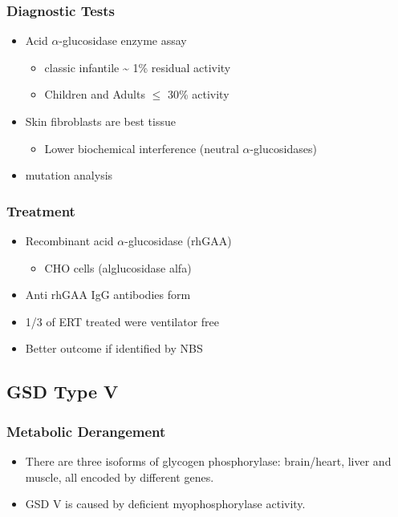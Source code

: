 \documentclass{scrartcl}
\begin{document}
\subsubsection{Diagnostic Tests}
\label{sec:org9a9de5c}
\begin{itemize}
\item Acid \(\alpha\)-glucosidase enzyme assay
\begin{itemize}
\item classic infantile \textasciitilde{} 1\% residual activity
\item Children and Adults \(\le\) 30\% activity
\end{itemize}
\item Skin fibroblasts are best tissue
\begin{itemize}
\item Lower biochemical interference (neutral \(\alpha\)-glucosidases)
\end{itemize}
\item mutation analysis
\end{itemize}
\subsubsection{Treatment}
\label{sec:orgc143356}
\begin{itemize}
\item Recombinant acid \(\alpha\)-glucosidase (rhGAA)
\begin{itemize}
\item CHO cells (alglucosidase alfa)
\end{itemize}
\item Anti rhGAA IgG antibodies form
\item 1/3 of ERT treated were ventilator free
\item Better outcome if identified by NBS
\end{itemize}

\subsection{GSD Type V}
\label{sec:org743d0e1}
\subsubsection{Metabolic Derangement}
\label{sec:orga5cfd03}
\begin{itemize}
\item There are three isoforms of glycogen phosphorylase: brain/heart,
liver and muscle, all encoded by different genes.
\item GSD V is caused by deficient myophosphorylase activity.
\end{itemize}
\end{document}
